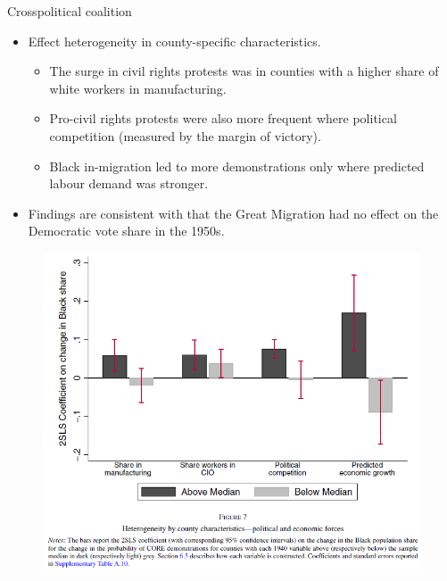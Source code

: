\documentclass[dvipdfmx,11pt]{beamer}
\begin{document}
\begin{frame}{Crosspolitical coalition}
  \begin{itemize}
    \item Effect heterogeneity in county-specific characteristics.
    \begin{itemize}
      \item The surge in civil rights protests was in counties with a higher share of white workers in manufacturing.
      \item Pro-civil rights protests were also more frequent where political competition (measured by the margin of victory).
      \item Black in-migration led to more demonstrations only where predicted labour demand was stronger.
    \end{itemize}
    \item Findings are consistent with that the Great Migration had no effect on the Democratic vote share in the 1950s.
  \end{itemize}
\end{frame}

\begin{frame}{}
  \begin{figure}
    \centering
    \includegraphics[scale = .5]{fig_tab/os20220708/F7.png}
  \end{figure}
\end{frame}
\end{document}
